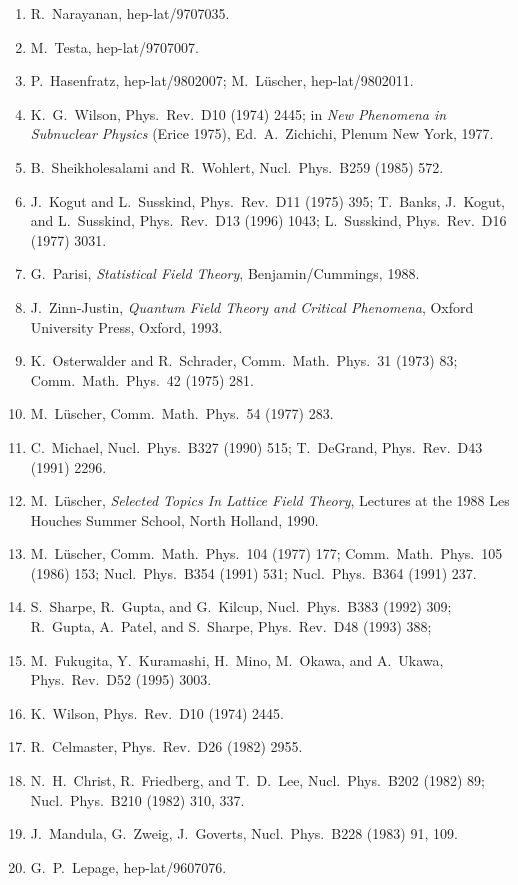 \begin{enumerate}
\item R.~Narayanan, hep-lat/9707035.
\item M.~Testa, hep-lat/9707007.
\item P.~Hasenfratz, hep-lat/9802007; M.~L\"uscher, hep-lat/9802011.
\item K.~G.~Wilson, Phys.\ Rev.\ D10 (1974) 2445; in \textit{New Phenomena in Subnuclear Physics} (Erice 1975), Ed.~A.~Zichichi, Plenum New York, 1977.
\item B.~Sheikholesalami and R.~Wohlert, Nucl.\ Phys.\ B259 (1985) 572.
\item J.~Kogut and L.~Susskind, Phys.\ Rev.\ D11 (1975) 395; T.~Banks, J.~Kogut, and L.~Susskind, Phys.\ Rev.\ D13 (1996) 1043; L.~Susskind, Phys.\ Rev.\ D16 (1977) 3031.
\item G.~Parisi, \textit{Statistical Field Theory}, Benjamin/Cummings, 1988.
\item J.~Zinn-Justin, \textit{Quantum Field Theory and Critical Phenomena}, Oxford University Press, Oxford, 1993.
\item K.~Osterwalder and R.~Schrader, Comm.\ Math.\ Phys.\ 31 (1973) 83; Comm.\ Math.\ Phys.\ 42 (1975) 281.
\item M.~L\"uscher, Comm.\ Math.\ Phys.\ 54 (1977) 283.
\item C.~Michael, Nucl.\ Phys.\ B327 (1990) 515; T.~DeGrand, Phys.\ Rev.\ D43 (1991) 2296.
\item M.~L\"uscher, \textit{Selected Topics In Lattice Field Theory}, Lectures at the 1988 Les Houches Summer School, North Holland, 1990.
\item M.~L\"uscher, Comm.\ Math.\ Phys.\ 104 (1977) 177; Comm.\ Math.\ Phys.\ 105 (1986) 153; Nucl.\ Phys.\ B354 (1991) 531; Nucl.\ Phys.\ B364 (1991) 237.
\item S.~Sharpe, R.~Gupta, and G.~Kilcup, Nucl.\ Phys.\ B383 (1992) 309; R.~Gupta, A.~Patel, and S.~Sharpe, Phys.\ Rev.\ D48 (1993) 388;
\item M.~Fukugita, Y.~Kuramashi, H.~Mino, M.~Okawa, and A.~Ukawa, Phys.\ Rev.\ D52 (1995) 3003.
\item K.~Wilson, Phys.\ Rev.\ D10 (1974) 2445.
\item R.~Celmaster, Phys.\ Rev.\ D26 (1982) 2955.
\item N.~H.~Christ, R.~Friedberg, and T.~D.~Lee, Nucl.\ Phys.\ B202 (1982) 89; Nucl.\ Phys.\ B210 (1982) 310, 337.
\item J.~Mandula, G.~Zweig, J.~Goverts, Nucl.\ Phys.\ B228 (1983) 91, 109.
\item G.~P.~Lepage, hep-lat/9607076.

\end{enumerate}
